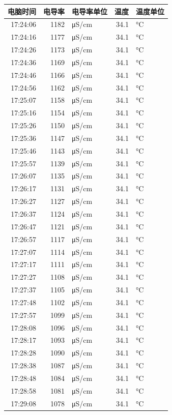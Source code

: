 \documentclass[11pt]{article}
\begin{document}
\begin{enumerate}
\begin{center}
\begin{tabular}{rrlrl}
电脑时间 & 电导率 & 电导率单位 & 温度 & 温度单位\\
\hline
17:24:06 & 1182 & μS/cm & 34.1 & °C\\
17:24:16 & 1177 & μS/cm & 34.1 & °C\\
17:24:26 & 1173 & μS/cm & 34.1 & °C\\
17:24:36 & 1169 & μS/cm & 34.1 & °C\\
17:24:46 & 1166 & μS/cm & 34.1 & °C\\
17:24:56 & 1162 & μS/cm & 34.1 & °C\\
17:25:07 & 1158 & μS/cm & 34.1 & °C\\
17:25:16 & 1154 & μS/cm & 34.1 & °C\\
17:25:26 & 1150 & μS/cm & 34.1 & °C\\
17:25:36 & 1147 & μS/cm & 34.1 & °C\\
17:25:46 & 1143 & μS/cm & 34.1 & °C\\
17:25:57 & 1139 & μS/cm & 34.1 & °C\\
17:26:07 & 1135 & μS/cm & 34.1 & °C\\
17:26:17 & 1131 & μS/cm & 34.1 & °C\\
17:26:27 & 1127 & μS/cm & 34.1 & °C\\
17:26:37 & 1124 & μS/cm & 34.1 & °C\\
17:26:47 & 1121 & μS/cm & 34.1 & °C\\
17:26:57 & 1117 & μS/cm & 34.1 & °C\\
17:27:07 & 1114 & μS/cm & 34.1 & °C\\
17:27:17 & 1111 & μS/cm & 34.1 & °C\\
17:27:27 & 1108 & μS/cm & 34.1 & °C\\
17:27:37 & 1105 & μS/cm & 34.1 & °C\\
17:27:48 & 1102 & μS/cm & 34.1 & °C\\
17:27:57 & 1099 & μS/cm & 34.1 & °C\\
17:28:08 & 1096 & μS/cm & 34.1 & °C\\
17:28:17 & 1093 & μS/cm & 34.1 & °C\\
17:28:28 & 1090 & μS/cm & 34.1 & °C\\
17:28:38 & 1087 & μS/cm & 34.1 & °C\\
17:28:48 & 1084 & μS/cm & 34.1 & °C\\
17:28:58 & 1081 & μS/cm & 34.1 & °C\\
17:29:08 & 1078 & μS/cm & 34.1 & °C\\

\end{tabular}
\end{center}
\end{enumerate}
\end{document}
